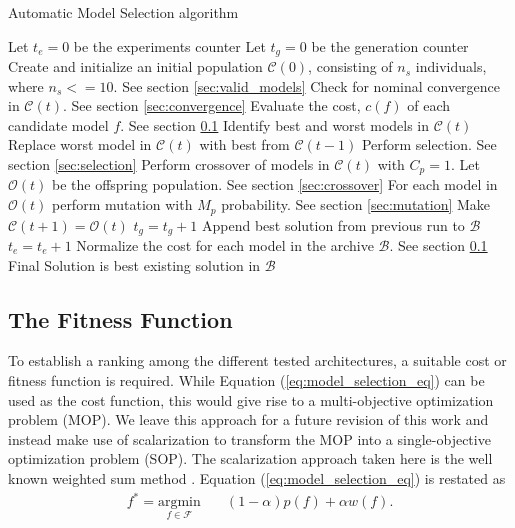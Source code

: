 \documentclass[12pt]{elsart}%
\begin{document}
\begin{algorithm}[!htb]
\caption{Automatic Model Selection algorithm}
\begin{algorithmic}
\State Let $t_e = 0$ be the experiments counter
	\State Let $t_g = 0$ be the generation counter
	\State Create and initialize an initial population $\mathcal{C}(0)$, consisting of $n_s$ individuals, where $n_s <= 10$. See section \ref{sec:valid_models}
		\State Check for nominal convergence in $\mathcal{C}(t)$. See section \ref{sec:convergence}
		\State Evaluate the cost, $c(f)$ of each candidate model $f$. See section \ref{sec:fitness_function}
		\State Identify best and worst models in $\mathcal{C}(t)$
		\State Replace worst model in $\mathcal{C}(t)$ with best from $\mathcal{C}(t-1)$
		\State Perform selection. See section \ref{sec:selection}
		\State Perform crossover of models in $\mathcal{C}(t)$ with $C_p=1$. Let $\mathcal{O}(t)$ be the offspring population. See section \ref{sec:crossover}
		\State For each model in $\mathcal{O}(t)$ perform mutation with $M_p$ probability. See section \ref{sec:mutation}
		\State Make $\mathcal{C}(t+1) = \mathcal{O}(t)$ 
	    \State $t_g = t_g + 1$
	\EndWhile
	 \State Append best solution from previous run to $\mathcal{B}$
	 \State $t_e = t_e + 1$
\EndWhile
\State Normalize the cost for each model in the archive $\mathcal{B}$. See section \ref{sec:fitness_function}
\State Final Solution is best existing solution in $\mathcal{B}$
\end{algorithmic}
\label{algorithm:nn_ea}
\end{algorithm}

\subsection{The Fitness Function}
\label{sec:fitness_function}

To establish a ranking among the different tested architectures, a suitable cost or fitness function is required. While Equation (\ref{eq:model_selection_eq}) can be used as the cost function, this would give rise to a multi-objective optimization problem (MOP). We leave this approach for a future revision of this work and instead make use of scalarization to transform the MOP into a single-objective optimization problem (SOP). The scalarization approach taken here is the well known weighted sum method \cite{Hillermeier2001}. Equation (\ref{eq:model_selection_eq}) is restated as
\begin{equation}
\begin{aligned}
	f^* = \underset{f \in \mathcal{F}}{\text{argmin}}
	& \quad (1-\alpha)p(f) + \alpha w(f).\\
\end{aligned}
\label{eq:model_selection_scalar}
\end{equation}
\end{document}
